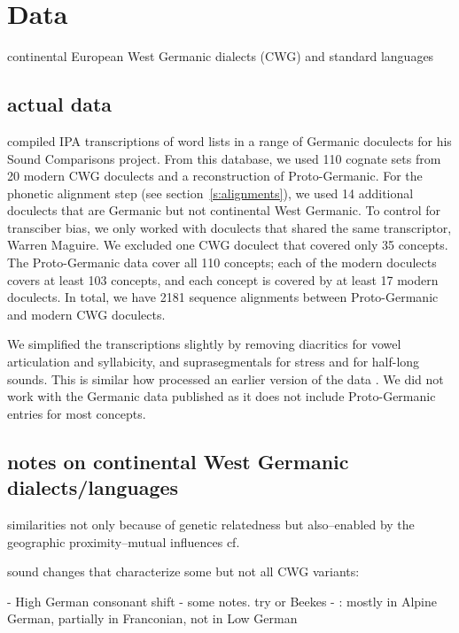 \documentclass{article}
\begin{document}
\section{Data}

continental European West Germanic dialects (CWG) and standard languages

\subsection{actual data}

\citet{heggarty2018sound} compiled IPA transcriptions of word lists in a range of Germanic doculects for his Sound Comparisons project.
From this database, we used 110 cognate sets from 20 modern CWG doculects and a reconstruction of Proto-Germanic.
For the phonetic alignment step (see section~\ref{s:alignments}), we used 14 additional doculects that are Germanic but not continental West Germanic. 
To control for transciber bias, we only worked with doculects that shared the same transcriptor, Warren Maguire.
We excluded one CWG doculect that covered only 35 concepts. %
The Proto-Germanic data cover all 110 concepts; each of the modern doculects covers at least 103 concepts, and each concept is covered by at least 17 modern doculects.
In total, we have 2181 sequence alignments between Proto-Germanic and modern CWG doculects.

We simplified the transcriptions slightly by removing diacritics for vowel articulation and syllabicity, and suprasegmentals for stress and for half-long sounds.
This is similar how \citet{list2014benchmark} processed an earlier version of the data \citep{renfrew2009languages}.
We did not work with the Germanic data \citeauthor{list2014benchmark} published as it does not include Proto-Germanic entries for most concepts.


\subsection{notes on continental West Germanic dialects/languages}

similarities not only because of genetic relatedness but also--enabled by the geographic proximity--mutual influences
cf. \citet[p. 8]{harbert2007germanic}


sound changes that characterize some but not all CWG variants:

- High German consonant shift
  - some notes. try \citet[pp. 47-48]{harbert2007germanic} or Beekes
  - \citet[p. 15]{harbert2007germanic}: mostly in Alpine German, partially in Franconian, not in Low German
\end{document}
